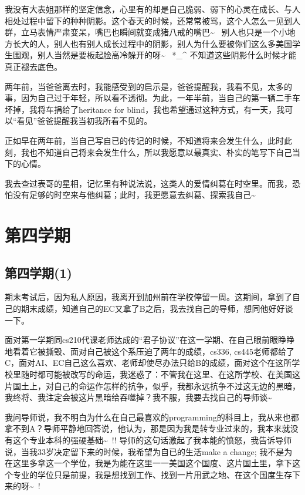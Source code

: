\documentclass[12pt]{book}
\begin{document}
我没有大表姐那样的坚定信念，心里有的却是自己脆弱、弱下的心灵在成长、与人相处过程中留下的种种阴影。这个春天的时候，还常常被骂，这个人怎么一见到人群，立马表情严肃变呆，嘴巴也瞬间就变成猪八戒的嘴巴\textasciitilde{}~ 别人也只是一个小地方长大的人，别人也有别人成长过程中的阴影，别人为什么要被你们这么多美国学生围观，别人当然是要板起脸高冷躲开的呀\textasciitilde{}~ *\_\^{} 不知道这些阴影什么时候才能真正褪去底色。

两年前，当爸爸离去时，我能感受到的启示是，爸爸提醒我，我看不见，太多的事，因为自己过于年轻，所以看不透彻。为此，一年半前，当自己的第一辆二手车坏掉，我将车捐给了heritance for blind，我也希望通过这种方式，有一天，我可以“看见”爸爸提醒我当初我所看不见的。

正如早在两年前，当自己写自已的传记的时候，不知道将来会发生什么，此时此刻，我也不知道自己将来会发生什么，所以我愿意以最真实、朴实的笔写下自己当下的心情。

我去查过表哥的星相，记忆里有种说法说，这类人的爱情纠葛在时空里。而我，恐怕没有足够的时空来与他纠葛；此时，我更愿意去纠葛、探索我自己\textasciitilde{}~

\chapter{第四学期}
\label{sec-45}
\section{第四学期(1)}
\label{sec-45-1}

期末考试后，因为私人原因，我离开到加州前在学校停留一周。这期间，拿到了自己的期末成绩，知道自己的EC又拿了B之后，我去找自己的导师，想同他好好谈一下。

面对第一学期同cs210代课老师达成的“君子协议”在这一学期、在自己眼前眼睁睁地看着它被撕毁、面对自己被这个系压迫了两年的成绩，cs336, cs445老师都给了C，面对AI、EC自己这么喜欢、老师却使尽办法只给B的成绩，面对这个在这所学校里随时都可能被改写的命运，我迷惑了：不管我在这里、在这所学校、在美国这片国土上，对自己的命运作怎样的抗争，似乎，我都永远抗争不过这无边的黑暗，我终将、我注定会被这片黑暗给吞噬掉？我不服，我要去找自己的导师谈\textasciitilde{}~

我问导师说，我不明白为什么在自己最喜欢的programming的科目上，我从来也都拿不到A？导师平静地回答说，他认为，那是因为我是转专业过来的，我本来就没有这个专业本科的强硬基础\textasciitilde{}~!! 导师的这句话激起了我本能的愤怒，我告诉导师说，当我33岁决定留下来的时候，我希望为自已的生活make a change; 我不是为在这里多拿这一个学位，我是为能在这里一一美国这个国度、这片国土里，拿下这个专业的学位只是前提，我是想找到工作、找到一片用武之地、在这个国度生存下来的呀\textasciitilde{}~! 
\end{document}
